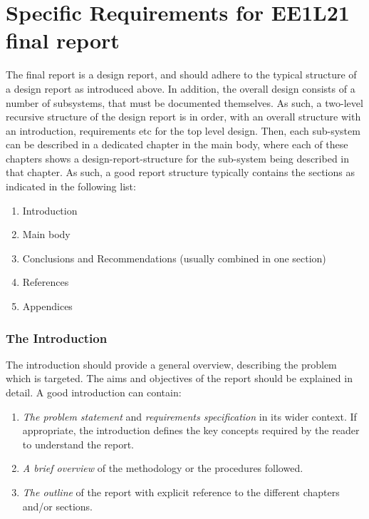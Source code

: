 \chapter{ Specific Requirements for EE1L21 final report}

  

  The final report is a design report, and should adhere to the typical structure of a design report as introduced above. In addition, the overall design consists of a number of subsystems, that must be documented themselves. As such, a two-level recursive structure of the design report is in order, with an overall structure with an introduction, requirements etc for the top level design. Then, each sub-system can be described in a dedicated chapter in the main body, where each of these chapters shows a design-report-structure for the sub-system being described in that chapter. As such, a good report structure typically contains the sections as indicated in the following list:

\begin{enumerate}
\item  Introduction

\item  Main body

\item  Conclusions and Recommendations (usually combined in one section)

\item  References

\item  Appendices
\end{enumerate}

  


\subsection{ The Introduction}

  

  The introduction should provide a general overview, describing the problem which is targeted. The aims and objectives of the report should be explained in detail. A good introduction can contain:

\begin{enumerate}
\item  \textit{The problem statement }and \textit{requirements specification }in its wider context. If appropriate, the introduction defines the key concepts required by the reader to understand the report.

\item  \textit{A brief overview }of the methodology or the procedures followed.

\item  \textit{The outline }of the report with explicit reference to the different chapters and/or sections.
\end{enumerate}

